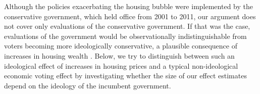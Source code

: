 \documentclass[12pt,a4paper]{article}
\begin{document}
	
	Although the policies exacerbating the housing bubble were implemented by the conservative government, which held office from 2001 to 2011, our argument does not cover only evaluations of the conservative government.  If that was the case, evaluations of the government would be observationally indistinguishable from voters becoming more ideologically conservative, a plausible consequence of increases in housing wealth \citep{ ansell2014political}. Below, we try to distinguish between such an ideological effect of increases in housing prices and a typical non-ideological economic voting effect by investigating whether the size of our effect estimates depend on the ideology of the incumbent government. 
	
	
	
	
\end{document}
